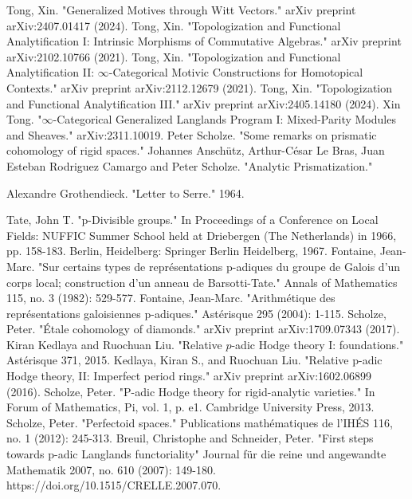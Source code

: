\documentclass[12pt]{article}
\theoremstyle{definition}
\begin{document}
\begin{thebibliography}{}
 Tong, Xin. "Generalized Motives through Witt Vectors." arXiv preprint arXiv:2407.01417 (2024).
 Tong, Xin. "Topologization and Functional Analytification I: Intrinsic Morphisms of Commutative Algebras." arXiv preprint arXiv:2102.10766 (2021).
 Tong, Xin. "Topologization and Functional Analytification II: $\infty $-Categorical Motivic Constructions for Homotopical Contexts." arXiv preprint arXiv:2112.12679 (2021).
 Tong, Xin. "Topologization and Functional Analytification III." arXiv preprint arXiv:2405.14180 (2024).
 Xin Tong. "$\infty$-Categorical Generalized Langlands Program I: Mixed-Parity Modules and Sheaves." arXiv:2311.10019.
 Peter Scholze. "Some remarks on prismatic cohomology of rigid spaces." 
 Johannes Ansch\"utz, Arthur-C\'esar Le Bras, Juan Esteban Rodriguez Camargo and Peter Scholze. "Analytic Prismatization."


 Alexandre Grothendieck. "Letter to Serre." 1964.


 Tate, John T. "p-Divisible groups." In Proceedings of a Conference on Local Fields: NUFFIC Summer School held at Driebergen (The Netherlands) in 1966, pp. 158-183. Berlin, Heidelberg: Springer Berlin Heidelberg, 1967.
 Fontaine, Jean-Marc. "Sur certains types de repr\'esentations p-adiques du groupe de Galois d'un corps local; construction d'un anneau de Barsotti-Tate." Annals of Mathematics 115, no. 3 (1982): 529-577.
 Fontaine, Jean-Marc. "Arithm\'etique des repr\'esentations galoisiennes p-adiques." Ast\'erisque 295 (2004): 1-115.
 Scholze, Peter. "\'Etale cohomology of diamonds." arXiv preprint arXiv:1709.07343 (2017).
 Kiran Kedlaya and Ruochuan Liu. "Relative $p$-adic Hodge theory I: foundations." Ast\'erisque 371, 2015.
 Kedlaya, Kiran S., and Ruochuan Liu. "Relative p-adic Hodge theory, II: Imperfect period rings." arXiv preprint arXiv:1602.06899 (2016).
 Scholze, Peter. "P-adic Hodge theory for rigid-analytic varieties." In Forum of Mathematics, Pi, vol. 1, p. e1. Cambridge University Press, 2013. 
 Scholze, Peter. "Perfectoid spaces." Publications math\'ematiques de l'IH\'ES 116, no. 1 (2012): 245-313.
 Breuil, Christophe and Schneider, Peter. "First steps towards p-adic Langlands functoriality" Journal f\"ur die reine und angewandte Mathematik 2007, no. 610 (2007): 149-180. https://doi.org/10.1515/CRELLE.2007.070.


\end{thebibliography}
\end{document}
